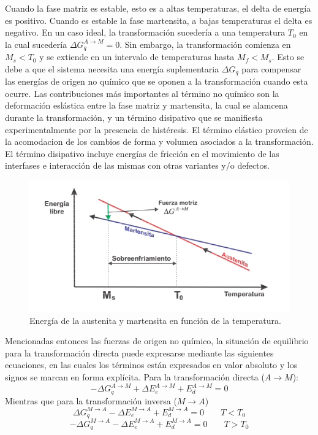\documentclass{article}
\theoremstyle{definition}
\theoremstyle{remark}
\begin{document}
Cuando la fase matriz es estable, esto es a altas temperaturas, el delta de energía es positivo. Cuando es estable la fase martensita, a bajas temperaturas el delta es negativo. En un caso ideal, la transformación sucedería a una temperatura $T_0$ en la cual sucedería $\Delta G^{A \rightarrow M}_q = 0$. Sin embargo, la transformación comienza en $M_s < T_0$ y se extiende en un intervalo de temperaturas hasta $M_f < M_s$. Esto se debe a que el sistema necesita una energía suplementaria $\Delta G_q$ para compensar las energías de origen no químico que se oponen a la transformación cuando esta ocurre. Las contribuciones más importantes al término no químico son la deformación eslástica entre la fase matriz y martensita, la cual se alamcena durante la transformación, y un término disipativo que se manifiesta experimentalmente por la presencia de histéresis. El término elástico proveien de la acomodacion de los cambios de forma y volumen asociados a la transformación. El término disipativo incluye energías de fricción en el movimiento de las interfases e interacción de las mismas con otras variantes y/o defectos.

\begin{figure}
	\label{Gibbs}
	\includegraphics[scale=0.5]{img/Gibbs.png}
	\caption{Energía de la austenita y martensita en función de la temperatura.}
\end{figure}


Mencionadas entonces las fuerzas de origen no químico, la situación de equilibrio para la transformación directa puede expresarse mediante las siguientes ecuaciones, en las cuales los términos están expresados en valor absoluto y los signos se marcan en forma explícita. Para la transformación directa ($A \rightarrow M$):
\begin{equation}\label{GibbsEq1}
	- \Delta G^{A \rightarrow M}_q + \Delta E^{A \rightarrow M}_e + E^{A \rightarrow M}_d = 0 
\end{equation}
Mientras que para la transformación inversa ($M \rightarrow A$)
\begin{equation}
	\Delta G^{M \rightarrow A}_q - \Delta E^{M \rightarrow A}_e + E^{M \rightarrow A}_d = 0 \;\;\;\;\;\;\; T<T_0
\end{equation}
\begin{equation}
	- \Delta G^{M \rightarrow A}_q - \Delta E^{M \rightarrow A}_e + E^{M \rightarrow A}_d = 0 \;\;\;\;\;\;\; T>T_0
\end{equation}
\end{document}

